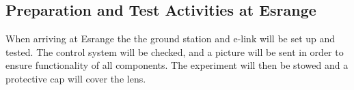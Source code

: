 \subsection{Preparation and Test Activities at Esrange}\label{prep_for_Esrange}
When arriving at Esrange the the ground station and e-link will be set up and tested. The control system will be checked, and a picture will be sent in order to ensure functionality of all components. The experiment will then be stowed and a protective cap will cover the lens.

